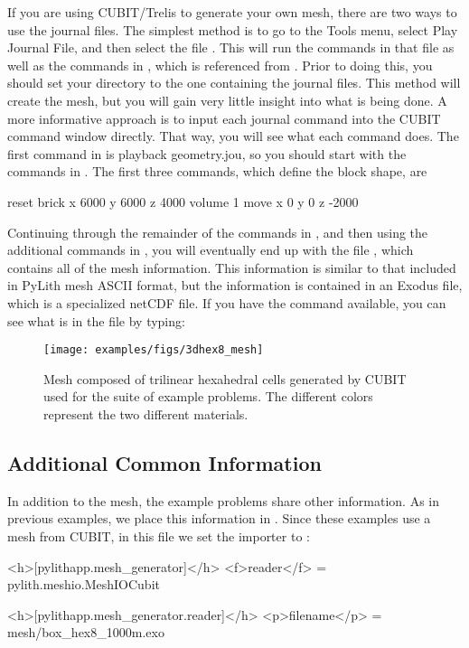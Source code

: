 If you are using CUBIT/Trelis to generate your own mesh, there are two
ways to use the journal files. The simplest method is to go to the
\textsf{Tools} menu, select \textsf{Play Journal File}, and then
select the file . This will run the
commands in that file as well as the commands in
, which is referenced from
. Prior to doing this, you should set
your directory to the one containing the journal files. This method
will create the mesh, but you will gain very little insight into what
is being done. A more informative approach is to input each journal
command into the CUBIT command window directly.  That way, you will
see what each command does. The first command in
 is \textsf{playback geometry.jou}, so
you should start with the commands in . The
first three commands, which define the block shape, are
\begin{shell}
reset
brick x 6000 y 6000 z 4000
volume 1 move x 0 y 0 z -2000
\end{shell}
Continuing through the remainder of the commands in ,
and then using the additional commands in ,
you will eventually end up with the file ,
which contains all of the mesh information. This information is similar
to that included in PyLith mesh ASCII format, but the information
is contained in an Exodus file, which is a specialized netCDF file.
If you have the  command available, you can see what
is in the file by typing:

\begin{figure}
  \texttt{[image: examples/figs/3dhex8\_mesh]}
  \caption{Mesh composed of trilinear hexahedral cells generated by CUBIT used
    for the suite of example problems. The different colors represent
    the two different materials.}
  \label{fig:3dhex8:mesh}
\end{figure}


\subsection{Additional Common Information}

In addition to the mesh, the example problems share other information.
As in previous examples, we place this information in .
Since these examples use a mesh from CUBIT, in this file we set the
importer to :
\begin{cfg}
<h>[pylithapp.mesh_generator]</h>
<f>reader</f> = pylith.meshio.MeshIOCubit

<h>[pylithapp.mesh_generator.reader]</h>
<p>filename</p> = mesh/box_hex8_1000m.exo
\end{cfg}

